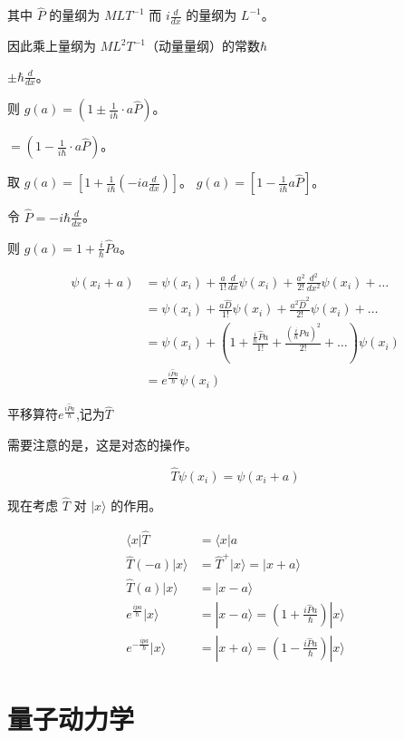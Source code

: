 \documentclass[lang=cn,15pt]{elegantbook}
\begin{document}
其中 $\hat{P}$ 的量纲为 $MLT^{-1}$ 而 $i \frac{d}{dx}$ 的量纲为 $L^{-1}$。

因此乘上量纲为 $ML^2T^{-1}$（动量量纲）的常数$\hbar$

 $\pm \hbar\frac{d}{dx}$。

则 $g(a) = (1 \pm \frac{1}{i\hbar} \cdot a \hat{P})$。

$= (1 - \frac{1}{i\hbar} \cdot a \hat{P})$。

取 $g(a) = [1 + \frac{1}{i\hbar} ( - i a \frac{d}{dx})]$。
$g(a) = [1 - \frac{1}{i\hbar} a \hat{P}]$。

令 $\hat{P} = - i \hbar \frac{d}{dx}$。

则 $g(a) = 1 + \frac{i}{\hbar} \hat{P} a$。

\begin{align*}
	\psi(x_i + a) & = \psi(x_i) + \frac{a}{1!} \frac{d}{dx} \psi(x_i) + \frac{a^2}{2!} \frac{d^2}{dx^2} \psi(x_i) + \ldots \\
	& = \psi(x_i) + \frac{a \hat{D}}{1!} \psi(x_i) + \frac{a^2 \hat{D}^2}{2!} \psi(x_i) + \ldots \\
	& = \psi(x_i) + \left(1 + \frac{\frac{i}{\hbar}\hat{P} a}{1!} + \frac{(\frac{i}{\hbar}\hat{P} a)^2}{2!} + \ldots \right) \psi(x_i) \\
	& = e^{\frac{i \hat{P} a}{\hbar}} \psi(x_i)
\end{align*}

平移算符$e^{\frac{i \hat{P} a}{\hbar}}$,记为$\hat{T}$

需要注意的是，这是对态的操作。

\[
\hat{T} \psi(x_i) = \psi(x_i + a)
\]

现在考虑 $\hat{T}$ 对 $|x\rangle$ 的作用。

\begin{align*}
	\langle x | \hat{T} & = \langle x | a \\
	\hat{T}(-a) | x \rangle & = \hat{T}^+ | x \rangle = | x + a \rangle \\
	\hat{T}(a) | x \rangle & = | x - a \rangle \\
	e^{\frac{i p a}{\hbar}} | x \rangle & = | x - a \rangle = \left( 1 + \frac{i \hat{P} a}{\hbar} \right) | x \rangle \\
	e^{-\frac{i p a}{\hbar}} | x \rangle & = | x + a \rangle = \left( 1 - \frac{i \hat{P} a}{\hbar} \right) | x \rangle
\end{align*}
\chapter{量子动力学}
\end{document}
